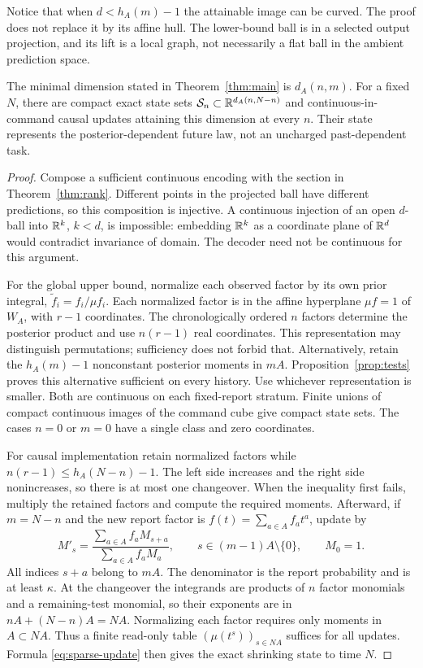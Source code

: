 Notice that when $d<h_A(m)-1$ the attainable image can be curved.
The proof does not replace it by its affine hull. The lower-bound ball
is in a selected output projection, and its lift is a local graph, not
necessarily a flat ball in the ambient prediction space.

\begin{theorem}\label{thm:causal}
The minimal dimension stated in Theorem~\ref{thm:main} is $d_A(n,m)$.
For a fixed $N$, there are compact exact state sets
$\mathcal S_n\subset\mathbb R^{d_A(n,N-n)}$ and continuous-in-command causal updates
attaining this dimension at every $n$. Their state represents the
posterior-dependent future law, not an uncharged past-dependent task.
\end{theorem}
\begin{proof}
Compose a sufficient continuous encoding with the section in
Theorem~\ref{thm:rank}. Different points in the projected ball have
different predictions, so this composition is injective. A continuous
injection of an open $d$-ball into $\mathbb R^k$, $k<d$, is impossible: embedding
$\mathbb R^k$ as a coordinate plane of $\mathbb R^d$ would contradict invariance of
domain. The decoder need not be continuous for this argument.

For the global upper bound, normalize each observed factor by its own
prior integral, $\widetilde f_i=f_i/\mu f_i$. Each normalized factor is
in the affine hyperplane $\mu f=1$ of $W_A$, with $r-1$ coordinates.
The chronologically ordered $n$ factors determine the posterior product
and use $n(r-1)$ real coordinates. This representation may distinguish
permutations; sufficiency does not forbid that. Alternatively, retain the
$h_A(m)-1$ nonconstant posterior moments in $mA$.
Proposition~\ref{prop:tests} proves this alternative sufficient on every
history. Use whichever representation is smaller. Both are continuous on
each fixed-report stratum. Finite unions of compact continuous images of
the command cube give compact state sets. The cases $n=0$ or $m=0$
have a single class and zero coordinates.

For causal implementation retain normalized factors while
$n(r-1)\le h_A(N-n)-1$. The left side increases and the right side
nonincreases, so there is at most one changeover. When the inequality first
fails, multiply the retained factors and compute the required moments.
Afterward, if $m=N-n$ and the new report factor is
$f(t)=\sum_{a\in A}f_at^a$, update by
\begin{equation}\label{eq:sparse-update}
 M'_s=\frac{\sum_{a\in A}f_aM_{s+a}}{\sum_{a\in A}f_aM_a},
 \qquad s\in(m-1)A\setminus\{0\},\qquad M_0=1.
\end{equation}
All indices $s+a$ belong to $mA$. The denominator is the report
probability and is at least $\kappa$. At the changeover the integrands
are products of $n$ factor monomials and a remaining-test monomial,
so their exponents are in $nA+(N-n)A=NA$. Normalizing each factor
requires only moments in $A\subset NA$. Thus a finite read-only table
$(\mu(t^s))_{s\in NA}$ suffices for all updates. Formula
\eqref{eq:sparse-update} then gives the exact shrinking state to time $N$.
\end{proof}

